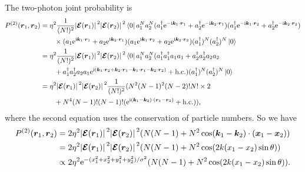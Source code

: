 \documentclass[hyperref, a4paper]{article}
\newcommand*{\ii}{\mathrm{i}}
\newcommand*{\ee}{\mathrm{e}}
\begin{document}
\begin{itemize}
The two-photon joint probability is 
\[
    \begin{aligned}
        P^{(2)}(\vb*{r}_1, \vb*{r}_2) &= \eta^2 \frac{1}{(N!)^2} \abs*{\vb*{\mathcal{E}}(\vb*{r}_1)}^2 \abs*{\vb*{\mathcal{E}}(\vb*{r}_2)}^2 \bra*{0} a_1^N a_2^N 
        (a_1^\dagger \ee^{- \ii \vb*{k}_1 \cdot \vb*{r}_1} + a_2^\dagger \ee^{- \ii \vb*{k}_2 \cdot \vb*{r}_1}) 
        (a_1^\dagger \ee^{- \ii \vb*{k}_1 \cdot \vb*{r}_2} + a_2^\dagger \ee^{- \ii \vb*{k}_2 \cdot \vb*{r}_2}) \\
        &\quad \quad \times (a_1 \ee^{\ii \vb*{k}_1 \cdot \vb*{r}_1} + a_2 \ee^{\ii \vb*{k}_2 \cdot \vb*{r}_1}) 
        (a_1 \ee^{\ii \vb*{k}_1 \cdot \vb*{r}_2} + a_2 \ee^{ \ii \vb*{k}_2 \cdot \vb*{r}_2}) (a_1^\dagger)^N  (a_2^\dagger)^N \ket*{0} \\
        &= \eta^2 \frac{1}{(N!)^2} \abs*{\vb*{\mathcal{E}}(\vb*{r}_1)}^2 \abs*{\vb*{\mathcal{E}}(\vb*{r}_2)}^2 \bra*{0} a_1^N a_2^N (a_1^\dagger a_1^\dagger a_1 a_1 + a_2^\dagger a_2^\dagger a_2 a_2 \\
        &\quad \quad + a_1^\dagger a_2^\dagger a_2 a_1 \ee^{\ii (\vb*{k}_1 \cdot \vb*{r}_2 + \vb*{k}_2 \cdot \vb*{r}_1 - \vb*{k}_1 \cdot \vb*{r}_1 - \vb*{k}_2 \cdot \vb*{r}_2)} + \text{h.c.} ) (a_1^\dagger)^N  (a_2^\dagger)^N \ket*{0} \\
        &= \eta^2 \abs*{\vb*{\mathcal{E}}(\vb*{r}_1)}^2 \abs*{\vb*{\mathcal{E}}(\vb*{r}_2)}^2 \frac{1}{(N!)^2} (N^2 (N - 1)^2 (N-2)! N! \times 2 \\
        &\quad \quad + N^4 (N-1)! (N-1)! (\ee^{\ii (\vb*{k}_1 - \vb*{k}_2) \cdot (\vb*{r}_1 - \vb*{r}_2)} + \text{h.c.})),
    \end{aligned}
\]
where the second equation uses the conservation of particle numbers.
So we have 
\begin{equation}
    \begin{aligned}
        P^{(2)}(\vb*{r}_1, \vb*{r}_2) &= 2 \eta^2 \abs*{\vb*{\mathcal{E}}(\vb*{r}_1)}^2 \abs*{\vb*{\mathcal{E}}(\vb*{r}_2)}^2 ( N (N-1) + N^2 \cos(\vb*{k}_1 - \vb*{k}_2) \cdot (\vb*{x}_1 - \vb*{x}_2) ) \\
        &= 2 \eta^2 \abs*{\vb*{\mathcal{E}}(\vb*{r}_1)}^2 \abs*{\vb*{\mathcal{E}}(\vb*{r}_2)}^2 ( N (N-1) + N^2 \cos(2 k (x_1 - x_2) \sin \theta) ) \\
        &\propto 2 \eta^2 \ee^{- (x_1^2 + x_2^2 + y_1^2 + y_2^2) / \sigma^2} ( N (N-1) + N^2 \cos(2 k (x_1 - x_2) \sin \theta) ) .
    \end{aligned}
\end{equation}


\end{itemize}
\end{document}
